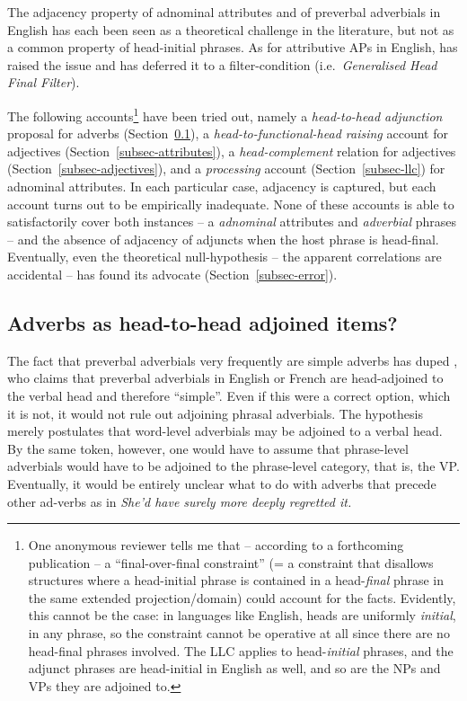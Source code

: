 \documentclass[output=paper
  ,nobabel
  ,uniformtopskip %
]{langscibook}
\begin{document}
The adjacency property of adnominal attributes and of preverbal adverbials in English has each been seen as a theoretical challenge in the literature, but not as a common property of head-initial phrases. As for attributive APs in English, \citet{Emonds76a-u} has raised the issue and \citet{Williams1982} has deferred it to a filter-condition (i.e.\ \emph{Generalised Head Final Filter}).

The following accounts\footnote{One anonymous reviewer tells me that – according to a forthcoming
  publication – a ``final-over-final constraint'' (= a constraint that disallows structures where a
  head-initial phrase is contained in a head-\emph{final} phrase in the same extended
  projection/domain) could account for the facts. Evidently, this cannot be the case: in languages
  like English, heads are uniformly \emph{initial}, in any phrase, so the constraint cannot be
  operative at all since there are no head-final phrases involved. The LLC applies to
  head-\emph{initial} phrases, and the adjunct phrases are head-initial in English as well, and so
  are the NPs and VPs they are adjoined to.} have been tried out, namely a \emph{head-to-head
  adjunction} proposal for adverbs (Section~\ref{subsec-adverbs}), a \emph{head-to-functional-head
  raising} account for adjectives (Section~\ref{subsec-attributes}), a \emph{head-complement}
relation for adjectives (Section~\ref{subsec-adjectives}), and a \emph{processing} account (Section~\ref{subsec-llc}) for
adnominal attributes. In each particular case, adjacency is captured, but each account turns out to
be empirically inadequate. None of these accounts is able to satisfactorily cover both instances –
a \emph{adnominal} attributes and \emph{adverbial} phrases – and the absence of adjacency of adjuncts when the host phrase is head-final. Eventually, even the theoretical null-hypothesis – the apparent correlations are accidental – has found its advocate (Section~\ref{subsec-error}).

\subsection{Adverbs as head-to-head adjoined items?}\label{subsec-adverbs}

The fact that preverbal adverbials very frequently are simple adverbs has duped \citet[409]{Bouchard1995}, who claims that preverbal adverbials in English or French are head-adjoined to the verbal head and therefore ``simple''. Even if this were a correct option, which it is not, it would not rule out adjoining phrasal adverbials. The hypothesis merely postulates that word-level adverbials may be adjoined to a verbal head. By the same token, however, one would have to assume that phrase-level adverbials would have to be adjoined to the phrase-level category, that is, the VP. Eventually, it would be entirely unclear what to do with adverbs that precede other ad-verbs as in \emph{She'd have surely more deeply regretted it.}
\end{document}
